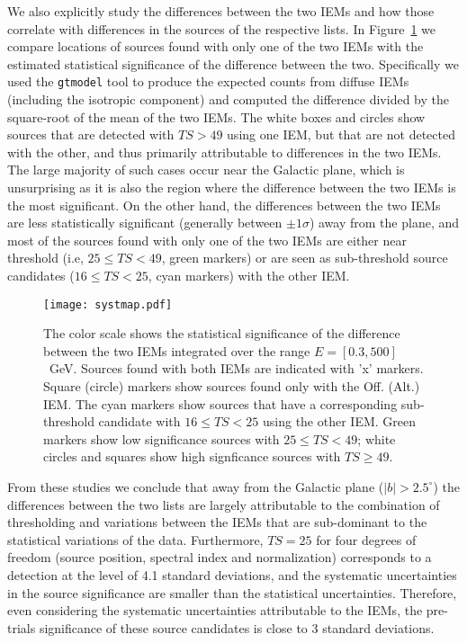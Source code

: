 \documentclass[iop]{emulateapj}
\begin{document}
We also explicitly study the differences between the two
  IEMs and how those correlate with differences in the sources 
  of the respective lists.  In Figure~\ref{fig:systmap} we compare locations
  of sources found with only one of the two IEMs with the estimated
  statistical significance of the difference between the two.
  Specifically we used the {\texttt{gtmodel}} tool to produce the
  expected counts from diffuse IEMs (including the isotropic
  component) and computed the difference divided by the square-root of
  the mean of the two IEMs.  The white boxes and circles show sources that are
  detected with $TS > 49$ using one IEM, but that are not detected
  with the other, and thus primarily attributable to differences in the
  two IEMs.  The large majority of such cases occur near the Galactic
  plane, which is unsurprising as it is also the region where the
  difference between the two IEMs is the most significant.  On the
  other hand, the differences between the two IEMs are less
  statistically significant (generally between $\pm 1 \sigma$) away
  from the plane, and most of the sources found with only one of the
  two IEMs are either near threshold (i.e, $25 \le TS < 49$, green markers)
  or are seen as sub-threshold source candidates ($16 \le TS <  25$, cyan
  markers) with the other IEM.

\begin{figure}[!ht]
  \centering
\texttt{[image: systmap.pdf]}
\caption{The color scale shows the statistical significance of the
  difference between the two IEMs integrated over the range
  $E = [0.3,500]$~GeV.  Sources found with both IEMs are indicated
  with 'x' markers.  Square (circle) markers show sources found only
  with the Off. (Alt.) IEM.  The cyan markers show sources that have a
  corresponding sub-threshold candidate with $16 \le TS < 25$ using the other IEM.  Green
  markers show low significance sources with $25 \le TS <
  49$;  white circles and squares show high signficance sources with $TS \ge 49$.}
\label{fig:systmap} 
\end{figure}


From these studies we conclude that away from the Galactic
  plane ($|b| > 2.5^\circ$) the differences between the two 
  lists are largely attributable to the combination of thresholding
  and variations between the IEMs that are sub-dominant to the statistical
  variations of the data.  Furthermore, $TS = 25$ for four degrees of
  freedom (source position, spectral index and normalization)
  corresponds to a detection at the level of 4.1 standard deviations,
  and the systematic uncertainties in the source significance are
  smaller than the statistical uncertainties.  Therefore, even
  considering the systematic uncertainties attributable to the IEMs, the
  pre-trials significance of these source candidates is close to 3 standard
  deviations.
\end{document}
